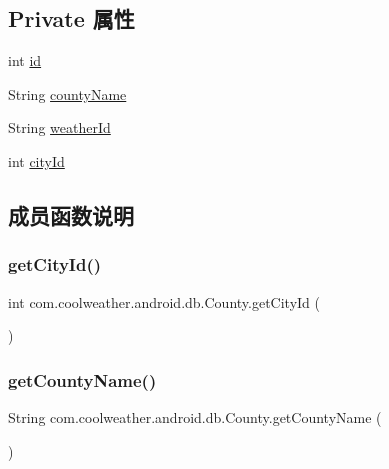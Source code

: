 \subsection*{Private 属性}
\begin{DoxyCompactItemize}
\item 
int \mbox{\hyperlink{classcom_1_1coolweather_1_1android_1_1db_1_1_county_a403abab6be77b743e58d126fa5ed78b5}{id}}
\item 
String \mbox{\hyperlink{classcom_1_1coolweather_1_1android_1_1db_1_1_county_a0f7eb4416897c5c758d145121d6c30cd}{county\+Name}}
\item 
String \mbox{\hyperlink{classcom_1_1coolweather_1_1android_1_1db_1_1_county_a6e7a184e8028098a75c67768b10ab6d3}{weather\+Id}}
\item 
int \mbox{\hyperlink{classcom_1_1coolweather_1_1android_1_1db_1_1_county_a3b2b5d74078fa6a7c3c4b31d526816d5}{city\+Id}}
\end{DoxyCompactItemize}


\subsection{成员函数说明}
\mbox{\label{classcom_1_1coolweather_1_1android_1_1db_1_1_county_a6c22ae34e236d4036a88b542f045f1f6}} 
\subsubsection{\texorpdfstring{getCityId()}{getCityId()}}
{\footnotesize\ttfamily int com.\+coolweather.\+android.\+db.\+County.\+get\+City\+Id (\begin{DoxyParamCaption}{ }\end{DoxyParamCaption})\hspace{0.3cm}{\ttfamily [inline]}}

\mbox{\label{classcom_1_1coolweather_1_1android_1_1db_1_1_county_a1de2cbf5aa040b58853f2b77fa2d5805}} 
\subsubsection{\texorpdfstring{getCountyName()}{getCountyName()}}
{\footnotesize\ttfamily String com.\+coolweather.\+android.\+db.\+County.\+get\+County\+Name (\begin{DoxyParamCaption}{ }\end{DoxyParamCaption})\hspace{0.3cm}{\ttfamily [inline]}}

